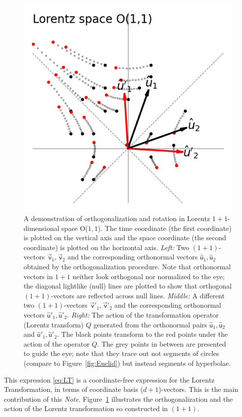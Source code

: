 \documentclass{article}
\newcommand\upvec[1]{\!\vec{\,\mathrm{#1}}}
\newcommand{\Lvec}[1]{\upvec{\mathsf{#1}}} %
\newcommand{\Lhat}[1]{\hat{\mathsf{#1}}} %
\newcommand{\plus}{\!+\!} %
\newcommand{\documentname}{\textsl{Note}}
\newcommand{\figref}[1]{Figure~\ref{#1}}
\newlength{\figurewidth}
\begin{document}
\begin{figure}[t]
\begin{mdframed}
\includegraphics[width=\figurewidth]{L_Q.png}
\caption{A demonstration of orthogonalization and rotation in Lorentz $1\plus1$-dimensional space O($1,1$).
The time coordinate (the first coordinate) is plotted on the vertical axis and the space coordinate (the second coordinate) is plotted on the horizontal axis.
\textsl{Left:} Two $(1\plus1)$-vectors $\Lvec{v}_1, \Lvec{v}_2$ and the corresponding orthonormal vectors $\Lhat{u}_1, \Lhat{u}_2$ obtained by the orthogonalization procedure.
Note that orthonormal vectors in $1\plus1$ neither look orthogonal nor normalized to the eye; the diagonal lightlike (null) lines are plotted to show that orthogonal $(1\plus1)$-vectors are reflected across null lines.
\textsl{Middle:} A different two $(1\plus1)$-vectors $\Lvec{v}'_1, \Lvec{v}'_2$ and the corresponding orthonormal vectors $\Lhat{u}'_1, \Lhat{u}'_2$.
\textsl{Right:} The action of the transformation operator (Lorentz transform) $Q$ generated from the orthonormal pairs $\Lhat{u}_1, \Lhat{u}_2$ and $\Lhat{u}'_1, \Lhat{u}'_2$.
The black points transform to the red points under the action of the operator $Q$.
The grey points in between are presented to guide the eye; 
note that they trace out not segments of circles (compare to \figref{fig:Euclid}) but instead segments of hyperbolae.\label{fig:Lorentz}}
\end{mdframed}
\end{figure}
This expression \eqref{eq:LT} is a coordinate-free expression for the Lorentz Transformation, in terms of coordinate basis ($d\plus1$)-vectors.
This is the main contribution of this \documentname.
\figref{fig:Lorentz} illustrates the orthogonalization and the action of the Lorentz transformation so constructed in $(1\plus1)$.
\end{document}
